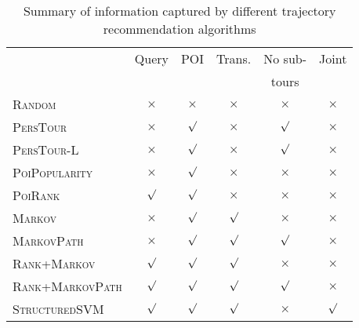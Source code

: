 

\begin{table}[t]
\caption{Summary of information captured by different trajectory recommendation algorithms}
\label{tab:algsummary}
\centering
\setlength{\tabcolsep}{3pt} %
\begin{tabular}{l|*{5}{c}} \hline
                                & Query    & POI      & Trans.     & No sub-      & Joint    \\
                                &          &          &            & tours        &          \\ \hline
\textsc{Random}                 & $\times$ & $\times$ & $\times$   & $\times$     & $\times$ \\
\textsc{PersTour}\cite{ijcai15} & $\times$ & $\surd$  & $\times$   & $\surd$      & $\times$ \\
\textsc{PersTour-L}             & $\times$ & $\surd$  & $\times$   & $\surd$      & $\times$ \\
\textsc{PoiPopularity}          & $\times$ & $\surd$  & $\times$   & $\times$     & $\times$ \\
\textsc{PoiRank}                & $\surd$  & $\surd$  & $\times$   & $\times$     & $\times$ \\
\textsc{Markov}                 & $\times$ & $\surd$  & $\surd$    & $\times$     & $\times$ \\
\textsc{MarkovPath}             & $\times$ & $\surd$  & $\surd$    & $\surd$      & $\times$ \\
\textsc{Rank+Markov}            & $\surd$  & $\surd$  & $\surd$    & $\times$     & $\times$ \\
\textsc{Rank+MarkovPath}        & $\surd$  & $\surd$  & $\surd$    & $\surd$      & $\times$ \\
\textsc{StructuredSVM}          & $\surd$  & $\surd$  & $\surd$    & $\times$     & $\surd$  \\ \hline
\end{tabular}
\captionmoveup
\end{table}
